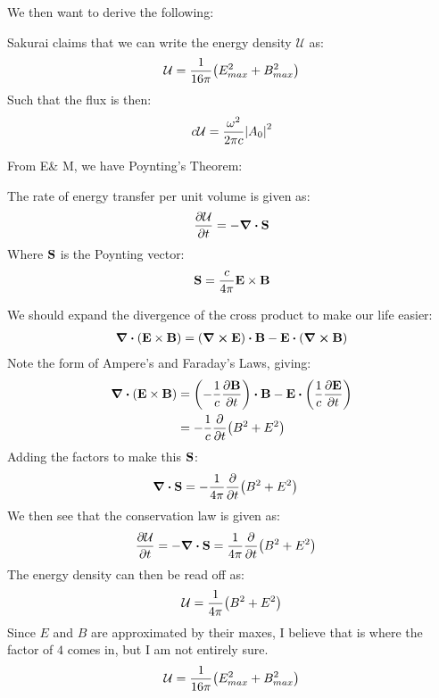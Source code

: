 \documentclass[12pt]{article}
\begin{document}
We then want to derive the following:
\begin{thebook}
  Sakurai claims that we can write the energy density $\mathcal{U}$ as:
  \begin{align*}
    \mathcal{U}=\frac1{16\pi}\qty(E_{max}^2+B_{max}^2)
  \end{align*}
  Such that the flux is then:
  \begin{align*}
    c\mathcal{U}=\frac{\omega^2}{2\pi c}\abs{A_0}^2
  \end{align*}
\end{thebook}
From E\& M, we have Poynting's Theorem:
\begin{theorem}
  The rate of energy transfer per unit volume is given as:
  \begin{align*}
    \pdv{\mathcal{U}}{t}=-\div{\vb{S}}
  \end{align*}
  Where $\vb{S}$ is the Poynting vector:
  \begin{align*}
    \vb{S}=\frac{c}{4\pi}\vb{E\times B}
  \end{align*}
\end{theorem}
We should expand the divergence of the cross product to make our life easier:
\begin{align*}
  \div{(\vb{E\times B})}=(\curl{\vb{E}})\vdot \vb{B}
  -\vb{E}\vdot(\curl{\vb{B}})
\end{align*}
Note the form of Ampere's and Faraday's Laws, giving:
\begin{align*}
  \div{(\vb{E\times B})}&=\qty(-\frac1c\pdv{\vb{B}}{t})\vdot \vb{B}
  -\vb{E}\vdot\qty(\frac1c\pdv{\vb{E}}{t})\\
  &=-\frac1c\pdv{t}\qty(B^2+E^2)
\end{align*}
Adding the factors to make this $\vb{S}$:
\begin{align*}
  \div{\vb{S}}&=-\frac1{4\pi}\pdv{t}\qty(B^2+E^2)
\end{align*}
We then see that the conservation law is given as:
\begin{align*}
  \pdv{\mathcal{U}}{t}=-\div{\vb{S}}&=\frac1{4\pi}\pdv{t}\qty(B^2+E^2)
\end{align*}
The energy density can then be read off as:
\begin{align*}
  \mathcal{U}=\frac1{4\pi}\qty(B^2+E^2)
\end{align*}
Since $E$ and $B$ are approximated by their maxes, I believe that is where the factor of $4$ comes in, but I am not entirely sure.
\begin{align*}
  \mathcal{U}=\frac1{16\pi}\qty(E^2_{max}+B^2_{max})
\end{align*}
\end{document}
